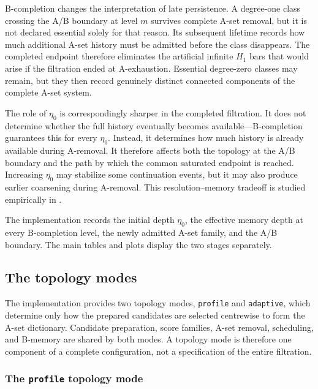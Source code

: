 \documentclass[a4paper,11pt]{article}
\theoremstyle{definition}
\theoremstyle{remark}
\begin{document}
B-completion changes the interpretation of late persistence. A degree-one class crossing the A/B boundary at level $m$ survives complete A-set removal, but it is not declared essential solely for that reason. Its subsequent lifetime records how much additional A-set history must be admitted before the class disappears. The completed endpoint therefore eliminates the artificial infinite $H_1$ bars that would arise if the filtration ended at A-exhaustion. Essential degree-zero classes may remain, but they then record genuinely distinct connected components of the complete A-set system.

The role of $\eta_0$ is correspondingly sharper in the completed filtration. It does not determine whether the full history eventually becomes available---B-completion guarantees this for every $\eta_0$. Instead, it determines how much history is already available during A-removal. It therefore affects both the topology at the A/B boundary and the path by which the common saturated endpoint is reached. Increasing $\eta_0$ may stabilize some continuation events, but it may also produce earlier coarsening during A-removal. This resolution--memory tradeoff is studied empirically in .

The implementation records the initial depth $\eta_0$, the effective memory depth at every B-completion level, the newly admitted A-set family, and the A/B boundary. The main tables and plots display the two stages separately.

\subsection{The topology modes}
\label{subsec:topology-modes}

The implementation provides two topology modes, \texttt{profile} and \texttt{adaptive}, which determine only how the prepared candidates are selected centrewise to form the A-set dictionary. Candidate preparation, score families, A-set removal, scheduling, and B-memory are shared by both modes. A topology mode is therefore one component of a complete configuration, not a specification of the entire filtration.


\subsubsection*{The \texttt{profile} topology mode}
\label{subsubsec:profile-mode}
\end{document}
